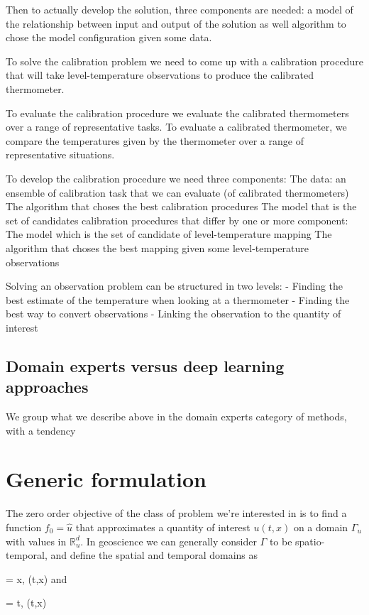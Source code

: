 \begin{bibunit}
Then to actually develop the solution, three components are needed: a model of the relationship between input and output of the solution as well algorithm to chose the model configuration given some data.


To solve the calibration problem we need to come up with a calibration procedure that will take level-temperature observations to produce the calibrated thermometer.

To evaluate the calibration procedure we evaluate the calibrated thermometers over a range of representative tasks.
To evaluate a calibrated thermometer, we compare the temperatures given by the thermometer over a range of representative situations.

To develop the calibration procedure we need three components:
The data: an ensemble of calibration task that we can evaluate (of calibrated thermometers)
The algorithm that choses the best calibration procedures 
The model that is the set of candidates calibration procedures that differ by one or more component:
  The model which is the set of candidate of level-temperature mapping
  The algorithm that choses the best mapping given some level-temperature observations







Solving an observation problem can be structured in two levels:
- Finding the best estimate of the temperature when looking at a thermometer
- Finding the best way to convert observations 
- Linking the observation to the quantity of interest

\subsection{Domain experts versus deep learning approaches}
  We group what we describe above in the domain experts category of methods, with a tendency 




\section{Generic formulation}

  The zero order objective of the class of problem we're interested in is to find a function $f_0=\hat{u}$  that approximates a quantity of interest $u(t, x)$ on a domain $\Gamma_u$ with values in $\mathbb{R}^d_u$. 
  In geoscience we can generally consider $\Gamma$ to be spatio-temporal, and define the spatial and temporal domains  as {\Omega = {x, (t,x) \in \Gamma} and {\Tau = {t, (t,x) \in \Gamma}

}}
\end{bibunit}
